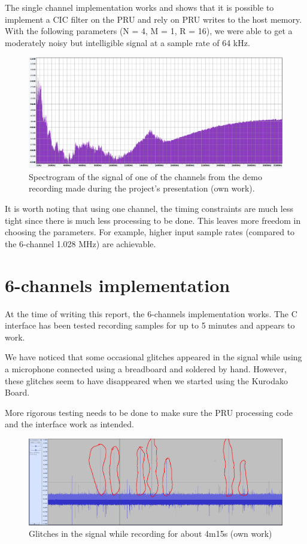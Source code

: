 \documentclass[]{report}
\begin{document}
The single channel implementation works and shows that it is possible to implement a CIC filter on the PRU and rely on PRU writes to the host memory. With the following parameters (N = 4, M = 1, R = 16), we were able to get a moderately noisy but intelligible signal at a sample rate of 64 kHz.

\begin{figure}[H]
\centering
\includegraphics[width=0.8\linewidth]{Pictures/spectrogram.png}
\caption{Spectrogram of the signal of one of the channels from the demo recording made during the project's presentation (own work).}
\end{figure}

It is worth noting that using one channel, the timing constraints are much less tight since there is much less processing to be done. This leaves more freedom in choosing the parameters. For example, higher input sample rates (compared to the 6-channel 1.028 MHz) are achievable.

\hypertarget{channels-implementation}{%
\section{6-channels implementation}\label{channels-implementation}}

At the time of writing this report, the 6-channels implementation works. The C interface has been tested recording samples for up to 5 minutes and appears to work.

We have noticed that some occasional glitches appeared in the signal while using a microphone connected using a breadboard and soldered by hand. However, these glitches seem to have disappeared when we started using the Kurodako Board.

More rigorous testing needs to be done to make sure the PRU processing code and the interface work as intended.

\begin{figure}[H]
\centering
\includegraphics[width=0.8\linewidth]{Pictures/glitches_circled.png}
\caption{Glitches in the signal while recording for about 4m15s (own work)}
\end{figure}
\end{document}
